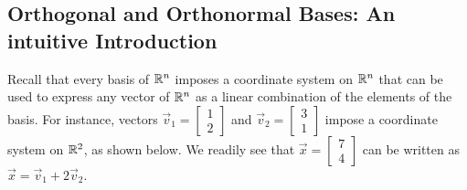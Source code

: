 \documentclass{ximera}
\begin{document}
\subsection*{Orthogonal and Orthonormal Bases: An intuitive Introduction}
Recall that every basis of $\mathbb{R}^n$ imposes a coordinate system on $\mathbb{R}^n$ that can be used to express any vector of $\mathbb{R}^n$ as a linear combination of the elements of the basis.  For instance,  vectors $\vec{v}_1=\begin{bmatrix}1\\2\end{bmatrix}$ and $\vec{v}_2=\begin{bmatrix}3\\1\end{bmatrix}$ impose a coordinate system on $\mathbb{R}^2$, as shown below.  We readily see that $\vec{x}=\begin{bmatrix}7\\4\end{bmatrix}$ can be written as $\vec{x}=\vec{v}_1+2\vec{v}_2$.
\end{document}
